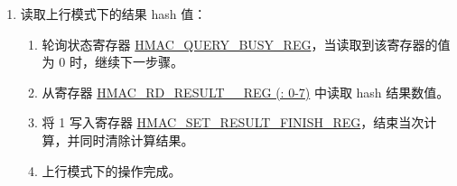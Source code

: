 \documentclass[main\_\_CN.tex]{subfiles}
\begin{document}
\begin{enumerate}
\begin{enumerate}
\begin{itemize}
\begin{enumerate}
                \item 自动完成数据传输。
            \end{enumerate}
            \item 如果 Block\_\textcolor{red}{n} 是倒数第二个填充数据块：
            \begin{enumerate}
                \item 将 512 位的数据块 Block\_\textcolor{red}{n} 写入寄存器 \hyperref[regdesc:HMACWRMESSAGENREG]
                {HMAC\_WR\_MESSAGE\_\_REG (: 0-15)} 中。随后，将 1 写入寄存器 \hyperref[regdesc:HMACSETMESSAGEONEREG]{HMAC\_SET\_MESSAGE\_ONE\_REG} 中，HMAC 模块将计算该数据块。
                \item 轮询状态寄存器 \hyperref[regdesc:HMACQUERYBUSYREG]{HMAC\_QUERY\_BUSY\_REG}，当读取到该寄存器的值为 0 时，继续下一步骤。
                \item 写 1 到寄存器 \hyperref[regdesc:HMACSETMESSAGEPADREG]{HMAC\_SET\_MESSAGE\_PAD\_REG} 中，随后跳转到步骤 c 继续数据传输。
            \end{enumerate}

            \item 如果 Block\_\textcolor{red}{n} 既不是最后一个也不是倒数第二个数据块：
            \begin{enumerate}
                \item 将 512 位的数据块 Block\_\textcolor{red}{n} 写入寄存器 \hyperref[regdesc:HMACWRMESSAGENREG]
                {HMAC\_WR\_MESSAGE\_\_REG (: 0-15)} 中。随后，将 1 写入寄存器 \hyperref[regdesc:HMACSETMESSAGEONEREG]{HMAC\_SET\_MESSAGE\_ONE\_REG} 中，HMAC 模块将计算该数据块。
                \item 轮询状态寄存器 \hyperref[regdesc:HMACQUERYBUSYREG]{HMAC\_QUERY\_BUSY\_REG}，当读取到该寄存器的值为 0 时，继续下一步骤。
                \item 写 1 到寄存器 \hyperref[regdesc:HMACSETMESSAGEINGREG]{HMAC\_SET\_MESSAGE\_ING\_REG} 中，随后跳转到步骤 c 继续数据传输。
            \end{enumerate}
        \end{itemize}
    \end{enumerate}

    \item 读取上行模式下的结果 hash 值：
    \begin{enumerate}
        \item 轮询状态寄存器 \hyperref[regdesc:HMACQUERYBUSYREG]{HMAC\_QUERY\_BUSY\_REG}，当读取到该寄存器的值为 0 时，继续下一步骤。
        \item 从寄存器 \hyperref[regdesc:HMACRDRESULTNREG]{HMAC\_RD\_RESULT\_\_REG (: 0-7)} 中读取 hash 结果数值。
        \item 将 1 写入寄存器 \hyperref[regdesc:HMACSETRESULTFINISHREG]{HMAC\_SET\_RESULT\_FINISH\_REG}，结束当次计算，并同时清除计算结果。
        \item 上行模式下的操作完成。
    \end{enumerate}
	\end{enumerate}
\end{document}
